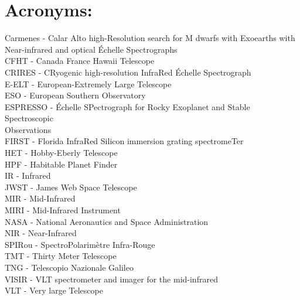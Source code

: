\documentclass[pdftex,12pt,a4paper]{article}
\begin{document}
\newpage
{}
{}




\newpage
\section*{Acronyms:}
\vspace{2mm}

Carmenes - Calar Alto high-Resolution search for M dwarfs with Exoearths with \\ Near-infrared and optical \'Echelle Spectrographs \vspace{2mm}\\
CFHT - Canada France Hawaii Telescope \vspace{2mm} \vspace{2mm}\\
CRIRES - CRyogenic high-resolution InfraRed \'Echelle Spectrograph \vspace{2mm}\\
E-ELT - European-Extremely Large Telescope \vspace{2mm}\\
ESO - European Southern Observatory\vspace{2mm} \vspace{2mm} \\
ESPRESSO - \'Echelle SPectrograph for Rocky Exoplanet and Stable Spectroscopic \\Observations\vspace{2mm}\\
FIRST - Florida InfraRed Silicon immersion grating spectromeTer \vspace{2mm}\\
HET - Hobby-Eberly Telescope \vspace{2mm}\\
HPF - Habitable Planet Finder \vspace{2mm}\\
IR - Infrared \vspace{2mm}\\
JWST - James Web Space Telescope \vspace{2mm}\\
MIR - Mid-Infrared \vspace{2mm}\\
MIRI - Mid-Infrared Instrument \vspace{2mm}\\
NASA - National Aeronautics and Space Administration \vspace{2mm} \\
NIR - Near-Infrared \vspace{2mm}\\
SPIRou - SpectroPolarim\`etre Infra-Rouge \vspace{2mm}\\
TMT - Thirty Meter Telescope\vspace{2mm}\\
TNG - Telescopio Nazionale Galileo \vspace{2mm}\\
VISIR - VLT spectrometer and imager for the mid-infrared \vspace{2mm}\\
VLT - Very large Telescope \vspace{2mm}\\
\end{document}
